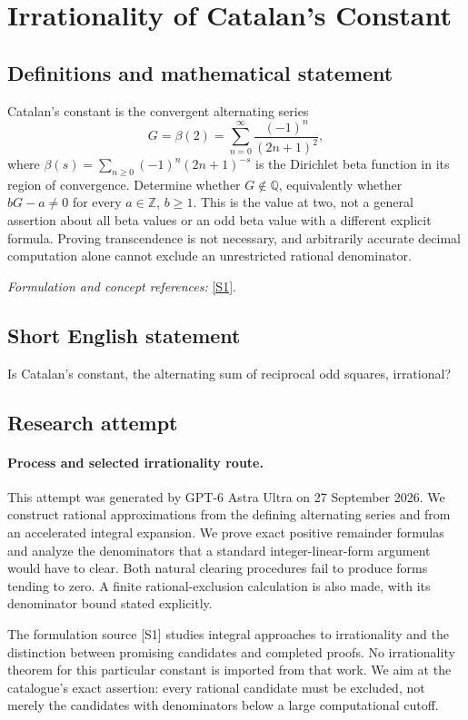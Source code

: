 \documentclass[11pt]{article}
\begin{document}
\section*{\texorpdfstring{Irrationality of Catalan’s Constant}{Irrationality of Catalan’s Constant}}\label{statement}
\subsection{Definitions and mathematical statement}
Catalan's constant is the convergent alternating series
\[
 G=\beta(2)=\sum_{n=0}^{\infty}\frac{(-1)^n}{(2n+1)^2},
\]
where $\beta(s)=\sum_{n\ge0}(-1)^n(2n+1)^{-s}$ is the Dirichlet beta function in its region of convergence. Determine whether $G\notin{\mathbb{Q}}$, equivalently whether $bG-a\ne0$ for every $a\in{\mathbb{Z}}$, $b\ge1$. This is the value at two, not a general assertion about all beta values or an odd beta value with a different explicit formula. Proving transcendence is not necessary, and arbitrarily accurate decimal computation alone cannot exclude an unrestricted rational denominator.
\par\smallskip\textit{Formulation and concept references:} \href{https://arxiv.org/abs/2101.08308}{[S1]}.

\subsection{Short English statement}
Is Catalan's constant, the alternating sum of reciprocal odd squares, irrational?
\subsection{Research attempt}
\paragraph{Process and selected irrationality route.}
This attempt was generated by GPT-6 Astra Ultra on 27 September 2026. We construct rational approximations from the defining alternating series and from an accelerated integral expansion. We prove exact positive remainder formulas and analyze the denominators that a standard integer-linear-form argument would have to clear. Both natural clearing procedures fail to produce forms tending to zero. A finite rational-exclusion calculation is also made, with its denominator bound stated explicitly.

The formulation source [S1] studies integral approaches to irrationality and the distinction between promising candidates and completed proofs. No irrationality theorem for this particular constant is imported from that work. We aim at the catalogue's exact assertion: every rational candidate must be excluded, not merely the candidates with denominators below a large computational cutoff.
\end{document}
